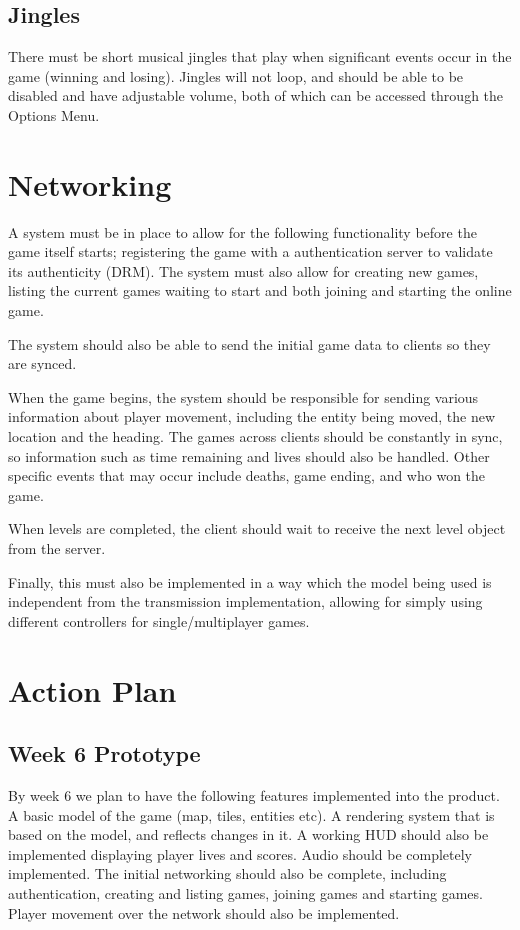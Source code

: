 \documentclass{scrreprt}
\begin{document}
\section{Jingles}
There must be short musical jingles that play when significant events occur in the game (winning and losing). Jingles will not loop, and should be able to be disabled and have adjustable volume, both of which can be accessed through the Options Menu.

\chapter{Networking}
A system must be in place to allow for the following functionality before the game itself starts; registering the game with a authentication server to validate its authenticity (DRM). The system must also allow for creating new games, listing the current games waiting to start and both joining and starting the online game. 

The system should also be able to send the initial game data to clients so they are synced.

When the game begins, the system should be responsible for sending various information about player movement, including the entity being moved, the new location and the heading. The games across clients should be constantly in sync, so information such as time remaining and lives should also be handled. Other specific events that may occur include deaths, game ending, and who won the game.

When levels are completed, the client should wait to receive the next level object from the server. 

Finally, this must also be implemented in a way which the model being used is independent from the transmission implementation, allowing for simply using different controllers for single/multiplayer games.

\chapter{Action Plan}
\section{Week 6 Prototype}
By week 6 we plan to have the following features implemented into the product. A basic model of the game (map, tiles, entities etc). A rendering system that is based on the model, and reflects changes in it. A working HUD should also be implemented displaying player lives and scores. Audio should be completely implemented. The initial networking should also be complete, including authentication, creating and listing games, joining games and starting games. Player movement over the network should also be implemented.
\end{document}
